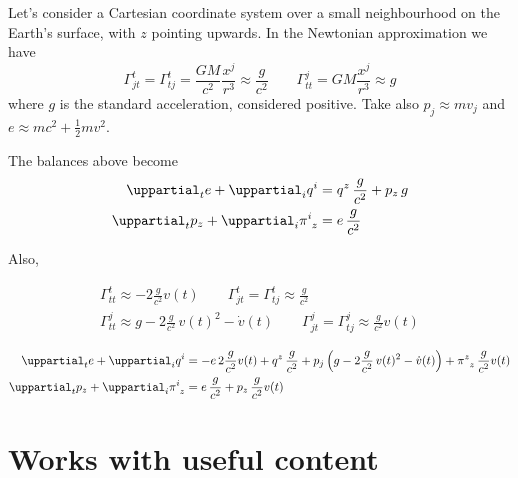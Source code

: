\documentclass[\ifafour a4paper,12pt,\else a5paper,10pt,\fi%
onecolumn,oneside,article,%
british%
]{memoir}
\theoremstyle{remark}
\theoremstyle{innote}
\newcommand*{\de}{\mathop{}\!\uppartial}%
\renewcommand*{\|}[1][]{\nonscript\:#1\vert\nonscript\:\mathopen{}}
\newcommand*{\sect}{\S}%
\renewcommand*{\i}{{}\indices}
\begin{document}
Let's consider a Cartesian coordinate system over a small neighbourhood on the Earth's surface, with $z$ pointing upwards. In the Newtonian approximation we have \autocites[\sect\,5.2.3]{poissonetal2014}
\begin{equation}
  \label{eq:christof_newt}
  \varGamma^{t}_{jt}=\varGamma^{t}_{tj} =
    \frac{GM}{c^{2}}\frac{x^{j}}{r^{3}} \approx \frac{g}{c^{2}}
  \qquad\varGamma^{j}_{tt} = GM\frac{x^{j}}{r^{3}} \approx g
\end{equation}
where $g$ is the standard acceleration, considered positive. Take also $p_{j} \approx m v_{j}$ and $e\approx m c^{2} + \frac{1}{2}mv^{2}$.



The balances above become
\begin{align}
  \label{eq:div_e_appr}
  \de_{t}e + \de_{i}q^{i} &=
  q^{z}\, \frac{g}{c^{2}}
  +p_{z}\, g
  \\
  \label{eq:div_p_appr}
  \de_{t}p_{z} +  \de_{i}\pi\i{^{i}_{z}} &=
  e\,\frac{g}{c^{2}}
\end{align}

Also,

\begin{equation}
  \label{eq:christof_body}
  \begin{gathered}
    \varGamma^{t}_{tt} \approx
    -2\frac{g}{c^{2}} v(t)
    \qquad
    \varGamma^{t}_{jt}=\varGamma^{t}_{tj}
    \approx \frac{g}{c^{2}}
    \\
    \varGamma^{j}_{tt} \approx
    g - 2\frac{g}{c^{2}}\,v(t)^{2} - \dot{v}(t)
    \qquad
    \varGamma^{j}_{jt} = \varGamma^{j}_{tj} \approx
    \frac{g}{c^{2}} v(t)
  \end{gathered}
\end{equation}

\begin{align}
  \label{eq:div_e_Newt}
  \de_{t}e + \de_{i}q^{i} &=
  -e\,2\frac{g}{c^{2}} v(t)
  +q^{z}\, \frac{g}{c^{2}}
  +p_{j}\, \Bigl(g - 2\frac{g}{c^{2}}\,v(t)^{2} - \dot{v}(t)\Bigr)
  +\pi\i{^{z}_{z}}\, \frac{g}{c^{2}} v(t)
  \\
  \label{eq:div_p_Newt}
  \de_{t}p_{z} +  \de_{i}\pi\i{^{i}_{z}} &=
  e\, \frac{g}{c^{2}}
  +p_{z}\,\frac{g}{c^{2}} v(t)
\end{align}


\section{Works with useful content}
\label{sec:works}
\end{document}
